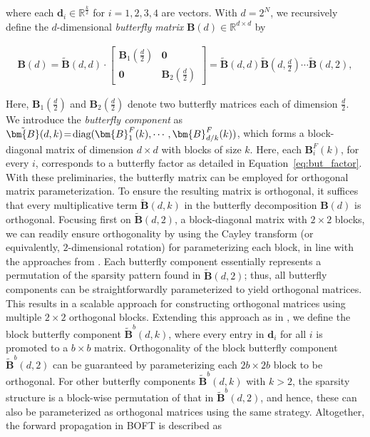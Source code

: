 where each $\bm{d}_i\in\mathbb{R}^{\frac{k}{2}}$ for $i=1,2,3,4$ are vectors. With $d=2^N$, we recursively define the $d$-dimensional \emph{butterfly matrix} $\bm{B}(d)\in\mathbb{R}^{d\times d}$ by

\begin{equation}
\begin{aligned}
    \!\!\bm{B}(d)=\tilde{\bm{B}}(d,d)\!\cdot\!\begin{bmatrix}
    \bm{B}_1(\frac{d}{2})\!\!\!\!\! & \bm{0} \\
    \bm{0}\!\!\!\!\! &\bm{B}_2(\frac{d}{2})
    \end{bmatrix}= \tilde{\bm{B}}(d,d)\tilde{\bm{B}}(d,\frac{d}{2})\cdots\tilde{\bm{B}}(d,2),
\end{aligned}
\end{equation}

Here, $\bm{B}_1(\frac{d}{2})$ and $\bm{B}_2(\frac{d}{2})$ denote two butterfly matrices each of dimension $\frac{d}{2}$. We introduce the \emph{butterfly component} as $\thickmuskip=2mu \medmuskip=2mu \tilde{\bm{B}}(d,k)=\text{diag}(\bm{B}^F_1(k),\cdots,\bm{B}^F_{d/k}(k))$, which forms a block-diagonal matrix of dimension $d\times d$ with blocks of size $k$. Here, each $\bm{B}^F_i(k)$, for every $i$, corresponds to a butterfly factor as detailed in Equation~\ref{eq:but_factor}. With these preliminaries, the butterfly matrix can be employed for orthogonal matrix parameterization. To ensure the resulting matrix is orthogonal, it suffices that every multiplicative term $\tilde{\bm{B}}(d,k)$ in the butterfly decomposition $\bm{B}(d)$ is orthogonal. Focusing first on $\tilde{\bm{B}}(d,2)$, a block-diagonal matrix with $2\times 2$ blocks, we can readily ensure orthogonality by using the Cayley transform (or equivalently, $2$-dimensional rotation) for parameterizing each block, in line with the approaches from \cite{liu2021orthogonal,qiu2023controlling}. Each butterfly component essentially represents a permutation of the sparsity pattern found in $\tilde{\bm{B}}(d,2)$; thus, all butterfly components can be straightforwardly parameterized to yield orthogonal matrices. This results in a scalable approach for constructing orthogonal matrices using multiple $2\times 2$ orthogonal blocks. Extending this approach as in \cite{chen2022pixelated}, we define the block butterfly component $\tilde{\bm{B}}^b(d,k)$, where every entry in $\bm{d}_i$ for all $i$ is promoted to a $b\times b$ matrix. Orthogonality of the block butterfly component $\tilde{\bm{B}}^b(d,2)$ can be guaranteed by parameterizing each $2b\times 2b$ block to be orthogonal. For other butterfly components $\tilde{\bm{B}}^b(d,k)$ with $k>2$, the sparsity structure is a block-wise permutation of that in $\tilde{\bm{B}}^b(d,2)$, and hence, these can also be parameterized as orthogonal matrices using the same strategy. Altogether, the forward propagation in BOFT is described as

